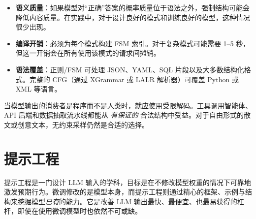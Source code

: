 \begin{itemize}
  \item \textbf{语义质量}：如果模型对“正确”答案的概率质量位于语法之外，强制结构可能会降低内容质量。在实践中，对于设计良好的模式和训练良好的模型，这种情况很少出现。
  \item \textbf{编译开销}：必须为每个模式构建 FSM 索引。对于复杂模式可能需要 1--5 秒，但这一开销会在所有使用该模式的请求间摊销。
  \item \textbf{语法覆盖}：正则/FSM 可处理 JSON、YAML、SQL 片段以及大多数结构化格式。完整的 CFG（通过 XGrammar 或 LALR 解析器）可覆盖 Python 或 XML 等语言。
\end{itemize}

\begin{keybox}[何时使用受限解码]
当模型输出的消费者是程序而不是人类时，就应使用受限解码。工具调用智能体、API 后端和数据抽取流水线都能从 \emph{有保证的} 合法结构中受益。对于自由形式的散文或创意文本，无约束采样仍然是合适的选择。
\end{keybox}

\section{提示工程}
\label{sec:prompt-engineering}

提示工程是一门设计 LLM 输入的学科，目标是在不修改模型权重的情况下可靠地激发预期行为。微调修改的是模型本身，而提示工程则通过精心的框架、示例与结构来挖掘模型\emph{已有}的能力。它是改善 LLM 输出最快、最便宜、也最易获得的杠杆，即使在使用微调模型时也依然不可或缺。

